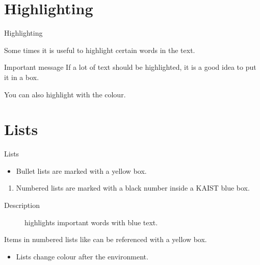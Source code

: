 \documentclass[UKenglish, aspectratio = 169]{beamer}
\begin{document}
\section{Highlighting}
\SectionPage

\begin{frame}{Highlighting}

    Some times it is useful to \alert{highlight} certain words in the text.

    \begin{alertblock}{Important message}
        If a lot of text should be \alert{highlighted}, it is a good idea to put it in a box.
    \end{alertblock}

    You can also highlight with the  colour.
\end{frame}

\section{Lists}

\begin{frame}{Lists}

    \begin{itemize}
        \item
        Bullet lists are marked with a yellow box.
    \end{itemize}

    \begin{enumerate}
        \item
        \label{enum:item}
        Numbered lists are marked with a black number inside a KAIST blue box.
    \end{enumerate}

    \begin{description}
        \item[Description] highlights important words with blue text.
    \end{description}
    
    Items in numbered lists like  can be referenced with a yellow box.

    \begin{example}
        \begin{itemize}
            \item
            Lists change colour after the environment.
        \end{itemize}
    \end{example}
\end{frame}
\end{document}
